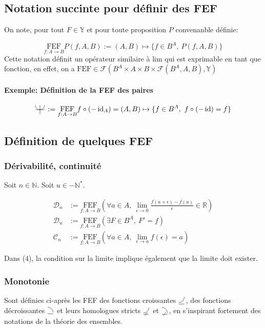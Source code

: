 \documentclass{article}
\newcommand{\R}{{\mathbb R}}
\newcommand{\Y}{{\mathbb Y}}
\newcommand{\FEF}[1]{\underset{f:A\to B}{\text{FEF}}#1}
\newcommand{\N}{{\mathbb N}}
\newcommand{\cC}{{\mathcal C}}
\newcommand{\cD}{{\mathcal D}}
\newcommand{\cF}{{\mathcal F}}
\newcommand{\id}{\operatorname{id}}
\newcommand{\decreasingfunctions}{%
	\begin{tikzpicture}[scale=1.75, baseline=0]%
		\draw (0,-0.25ex) -- (1ex,-0.25ex);%
		\draw (1ex,0) arc (0:90:1ex);%
	\end{tikzpicture}\,%
}
\newcommand{\strictlydecreasingfunctions}{%
	\begin{tikzpicture}[scale=1.75, baseline=0]%
		\draw (0,-0.25ex) -- (1ex,-0.25ex);%
		\draw (1ex,0) arc (0:90:1ex);%
		\draw (0.75ex,0.125ex) -- (0.25ex,-0.5ex);%
	\end{tikzpicture}\,%
}
\newcommand{\increasingfunctions}{%
	\begin{tikzpicture}[scale=1.75, baseline=0]%
		\draw (0,-0.25ex) -- (1ex,-0.25ex);%
		\draw (0,0) arc (-90:0:1ex);%
	\end{tikzpicture}\,%
}
\newcommand{\strictlyincreasingfunctions}{%
	\begin{tikzpicture}[scale=1.75, baseline=0]%
		\draw (0,-0.25ex) -- (1ex,-0.25ex);%
		\draw (0,0) arc (-90:0:1ex);%
		\draw (0.75ex,0.125ex) -- (0.25ex,-0.5ex);%
	\end{tikzpicture}\,%
}
\newcommand{\evenfunctions}{%
	\begin{tikzpicture}[scale=1.5, baseline=-0.5ex]%
		\draw (-1ex,0) -- (1ex,0);%
		\draw (0,-1ex) -- (0, 1ex);%
		\draw (0ex, 0ex) arc (-90:0:1ex);%
		\draw (0ex, 0ex) arc (90:0:-1ex);%
	\end{tikzpicture}\,%
}
\begin{document}
\subsection{Notation succinte pour définir des FEF}

On note, pour tout $F \in \Y$ et pour toute proposition $P$ convenanble définie:

\[
	\FEF{P(f, A, B)} := (A, B) \mapsto \{f\in B^A,\ P(f, A, B)\} 
\]
Cette notation définit un opérateur similaire à $\text{lim}$ qui est exprimable en tant que fonction, en effet, on a $\text{FEF} \in \cF(B^A \times A \times B \times \cF(B^A, A, B), \Y)$

\paragraph{Exemple: Définition de la FEF des paires}

\[
	\evenfunctions := \FEF{f\circ (-\id_A)} = (A, B) \mapsto \{f\in B^A,\ f \circ (-\id) = f \} 
\] 

\subsection{Définition de quelques FEF}

\subsubsection{Dérivabilité, continuité}

Soit $n \in \N$. Soit $u \in -\N^\ast$.

\begin{align}
	\cD_n &:= \FEF{\left(\forall a\in A,\ \lim_{\epsilon \to 0} \frac{f(a+\epsilon)-f(a)}{\epsilon} \in \R\right)}  \\
	\cD_u &:= \FEF{\left(\exists F\in B^A,\ F' = f\right)} \\
	\cC_n &:= \FEF{\left( \forall a\in A,\ \lim_{\epsilon \to a} f(\epsilon) = a \right)  } 
\end{align}

Dans (4), la condition sur la limite implique également que la limite doit exister.

\subsubsection{Monotonie}

Sont définies ci-après les FEF des fonctions croissantes $\increasingfunctions$, des fonctions décroissantes $\decreasingfunctions$ et leurs homologues stricts $\strictlyincreasingfunctions$ et $\strictlydecreasingfunctions$, en s'inspirant fortement des notations de la théorie des ensembles.
\end{document}
